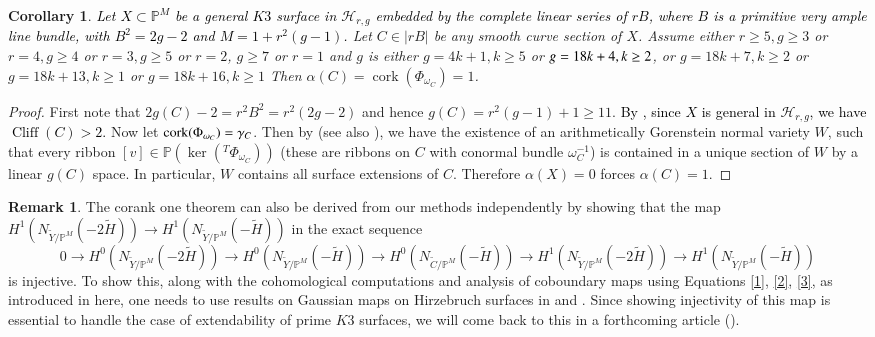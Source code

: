 \documentclass[11pt,twoside]{amsart}
\theoremstyle{plain}
\numberwithin{equation}{section}
\newtheorem{corollary}[theorem]{Corollary}
\theoremstyle{definition}
\newtheorem{remark}[theorem]{Remark}
\begin{document}
\begin{corollary}\label{corank one}
\textcolor{black}{Let $X \subset \mathbb{P}^{M}$ be a general $K3$ surface in $\mathcal{H}_{r,g}$ embedded by the complete linear series of $rB$, where $B$ is a primitive very ample line bundle, with $B^2 = 2g-2$ and $M = 1+r^2(g-1)$.} Let $C \in |rB|$ be any smooth curve section of $X$. Assume either $r \geq 5, g \geq 3$ or $r = 4, g \geq 4$ or $r = 3, g \geq 5$ or $r = 2$, $g \geq 7$ or $r = 1$ and $g$ is either $g = 4k+1, k \geq 5$ or $g = 18k+4,  \textcolor{black}{k \geq 2}$, or $g = 18k+7, k \geq 2$ or $g = 18k+13, k \geq 1$ or $g = 18k+16, k \geq 1$ Then $\alpha(C) = \operatorname{cork}(\Phi_{\omega_C}) = 1$.
\end{corollary}

\begin{proof}
First note that $2g(C)-2 = r^2B^2 = r^2(2g-2)$ and hence $g(C) = r^2(g-1)+1 \geq 11$. \textcolor{black}{By \cite[Lemma $8.3$]{K01}, since $X$ is general in $\mathcal{H}_{r,g}$, we have $\operatorname{Cliff}(C) > 2$.} Now let $\operatorname{cork}(\Phi_{\omega_C}) = \textcolor{black}{\gamma_C}$. Then by \cite[$2.2$, \textcolor{black}{$2.2.1$}, $2.2.2$]{CDS20} (see also \cite{ABS17}), we have the existence of an arithmetically Gorenstein normal variety $W$, such that every ribbon $[v] \in \mathbb{P}(\operatorname{ker}(^T\Phi_{\omega_C}))$ (these are ribbons on $C$ with conormal bundle $\omega_C^{-1}$) is contained in a unique section of $W$ by a linear $g(C)$ space. In particular, $W$ contains all surface extensions of $C$. Therefore $\alpha(X) = 0$ forces $\alpha(C) = 1$. 
\end{proof}

\begin{remark}{\label{independent corank one}}
The corank one theorem can also be derived from our methods independently by showing that the map $H^1(N_{\widetilde{Y}/\mathbb{P}^M}(-2\widetilde{H})) \to H^1(N_{\widetilde{Y}/\mathbb{P}^M}(-\widetilde{H}))$ in the exact sequence
$$0 \to H^0(N_{\widetilde{Y}/\mathbb{P}^M}(-2\widetilde{H})) \to H^0(N_{\widetilde{Y}/\mathbb{P}^M}(-\widetilde{H})) \to H^0(N_{\widetilde{C}/\mathbb{P}^M}(-\widetilde{H})) \to H^1(N_{\widetilde{Y}/\mathbb{P}^M}(-2\widetilde{H})) \to H^1(N_{\widetilde{Y}/\mathbb{P}^M}(-\widetilde{H}))$$
is injective. To show this, along with the cohomological computations and analysis of coboundary maps using Equations \ref{1}, \ref{2}, \ref{3}, as introduced in here, one needs to use results on Gaussian maps on Hirzebruch surfaces in \cite{DM92} and \cite{DP12}. Since showing injectivity of this map is essential to handle the case of extendability of prime $K3$ surfaces, we will come back to this in a forthcoming article (\cite{BM25}). 
\end{remark}
\end{document}
